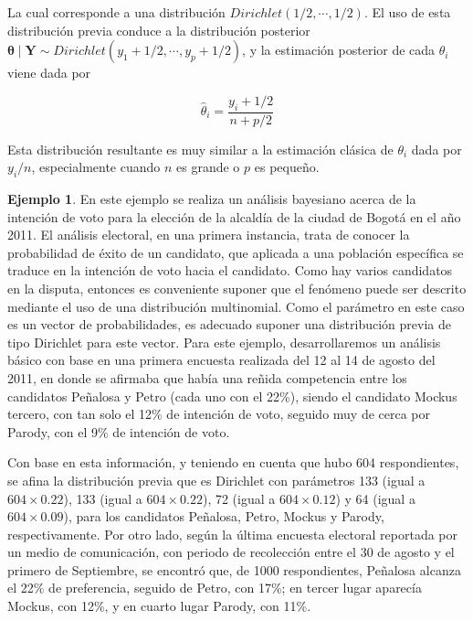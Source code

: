 \documentclass[
  10pt,
  spanish,
]{book}
\theoremstyle{definition}
\theoremstyle{definition}
\newtheorem{example}{Ejemplo}[chapter]
\theoremstyle{definition}
\theoremstyle{definition}
\theoremstyle{remark}
\begin{document}
La cual corresponde a una distribución \(Dirichlet(1/2,\cdots,1/2)\). El uso de esta distribución previa conduce a la distribución posterior \(\boldsymbol \theta\mid\mathbf{Y}\sim Dirichlet(y_1+1/2,\cdots,y_p+1/2)\), y la estimación posterior de cada \(\theta_i\) viene dada por

\begin{equation*}
\hat{\theta}_i=\frac{y_i+1/2}{n+p/2}
\end{equation*}

Esta distribución resultante es muy similar a la estimación clásica de \(\theta_i\) dada por \(y_i/n\), especialmente cuando \(n\) es grande o \(p\) es pequeño.

\begin{example}
\protect\hypertarget{exm:Multinomial}{}{\label{exm:Multinomial} }En este ejemplo se realiza un análisis bayesiano acerca de la intención de voto para la elección de la alcaldía de la ciudad de Bogotá en el año 2011. El análisis electoral, en una primera instancia, trata de conocer la probabilidad de éxito de un candidato, que aplicada a una población específica se traduce en la intención de voto hacia el candidato. Como hay varios candidatos en la disputa, entonces es conveniente suponer que el fenómeno puede ser descrito mediante el uso de una distribución multinomial. Como el parámetro en este caso es un vector de probabilidades, es adecuado suponer una distribución previa de tipo Dirichlet para este vector. Para este ejemplo, desarrollaremos un análisis básico con base en una primera encuesta realizada del 12 al 14 de agosto del 2011, en donde se afirmaba que había una reñida competencia entre los candidatos Peñalosa y Petro (cada uno con el 22\%), siendo el candidato Mockus tercero, con tan solo el 12\% de intención de voto, seguido muy de cerca por Parody, con el 9\% de intención de voto.

Con base en esta información, y teniendo en cuenta que hubo 604 respondientes, se afina la distribución previa que es Dirichlet con parámetros 133 (igual a \(604 \times 0.22\)), 133 (igual a \(604 \times 0.22\)), 72 (igual a \(604 \times 0.12\)) y 64 (igual a \(604 \times 0.09\)), para los candidatos Peñalosa, Petro, Mockus y Parody, respectivamente. Por otro lado, según la última encuesta electoral reportada por un medio de comunicación, con periodo de recolección entre el 30 de agosto y el primero de Septiembre, se encontró que, de 1000 respondientes, Peñalosa alcanza el 22\% de preferencia, seguido de Petro, con 17\%; en tercer lugar aparecía Mockus, con 12\%, y en cuarto lugar Parody, con 11\%.


\end{example}
\end{document}
